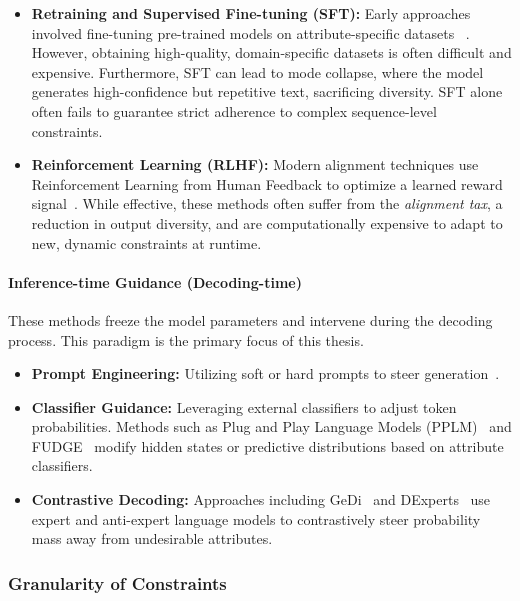 \documentclass[11pt]{article}
\begin{document}
\begin{itemize}
    \item \textbf{Retraining and Supervised Fine-tuning (SFT):} Early approaches involved fine-tuning pre-trained models on attribute-specific datasets 
    ~\cite{alhafni2024personalizedtextgenerationfinegrained}. However, obtaining high-quality, domain-specific datasets is often difficult and expensive. Furthermore, SFT can lead to mode collapse, where the model generates high-confidence but repetitive text, sacrificing diversity. SFT alone often fails to guarantee strict adherence to complex sequence-level constraints.
    \item \textbf{Reinforcement Learning (RLHF):} Modern alignment techniques use Reinforcement Learning from Human Feedback to optimize a learned reward signal~\cite{ouyang2022traininglanguagemodelsfollow, li2024reinforcementlearningtokenlevelfeedback}. While effective, these methods often suffer from the \emph{alignment tax}, a reduction in output diversity, and are computationally expensive to adapt to new, dynamic constraints at runtime.
\end{itemize}

\paragraph{Inference-time Guidance (Decoding-time)}
These methods freeze the model parameters and intervene during the decoding process. This paradigm is the primary focus of this thesis.

\begin{itemize}
    \item \textbf{Prompt Engineering:} Utilizing soft or hard prompts to steer generation~\cite{ouyang2022traininglanguagemodelsfollow}.
    \item \textbf{Classifier Guidance:} Leveraging external classifiers to adjust token probabilities. Methods such as Plug and Play Language Models (PPLM)~\cite{dathathri2020plugplaylanguagemodels} and FUDGE~\cite{Yang_2021} modify hidden states or predictive distributions based on attribute classifiers.
    \item \textbf{Contrastive Decoding:} Approaches including GeDi~\cite{krause-etal-2021-gedi-generative} and DExperts~\cite{liu-etal-2021-dexperts} use expert and anti-expert language models to contrastively steer probability mass away from undesirable attributes.
\end{itemize}

\subsubsection{Granularity of Constraints}
\end{document}
